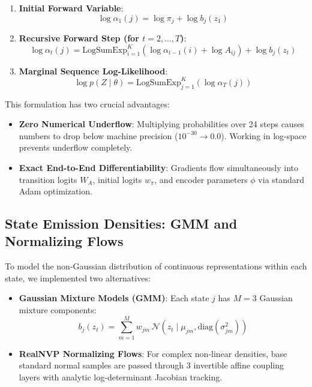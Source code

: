 \documentclass[11pt,a4paper]{article}
\begin{document}
\begin{enumerate}
    \item \textbf{Initial Forward Variable}:
    \begin{equation}
        \log \alpha_1(j) = \log \pi_j + \log b_j(z_1)
    \end{equation}
    \item \textbf{Recursive Forward Step (for $t = 2, \dots, T$)}:
    \begin{equation}
        \log \alpha_t(j) = \text{LogSumExp}_{i=1}^K \left( \log \alpha_{t-1}(i) + \log A_{ij} \right) + \log b_j(z_t)
    \end{equation}
    \item \textbf{Marginal Sequence Log-Likelihood}:
    \begin{equation}
        \log p(Z \mid \theta) = \text{LogSumExp}_{j=1}^K \left( \log \alpha_T(j) \right)
    \end{equation}
\end{enumerate}
This formulation has two crucial advantages:
\begin{itemize}
    \item \textbf{Zero Numerical Underflow}: Multiplying probabilities over 24 steps causes numbers to drop below machine precision ($10^{-30} \to 0.0$). Working in log-space prevents underflow completely.
    \item \textbf{Exact End-to-End Differentiability}: Gradients flow simultaneously into transition logits $W_A$, initial logits $w_\pi$, and encoder parameters $\phi$ via standard Adam optimization.
\end{itemize}

\subsection{State Emission Densities: GMM and Normalizing Flows}
To model the non-Gaussian distribution of continuous representations within each state, we implemented two alternatives:
\begin{itemize}
    \item \textbf{Gaussian Mixture Models (GMM)}: Each state $j$ has $M = 3$ Gaussian mixture components:
    \begin{equation}
        b_j(z_t) = \sum_{m=1}^M w_{jm} \, \mathcal{N}(z_t \mid \mu_{jm}, \text{diag}(\sigma_{jm}^2))
    \end{equation}
    \item \textbf{RealNVP Normalizing Flows}: For complex non-linear densities, base standard normal samples are passed through 3 invertible affine coupling layers with analytic log-determinant Jacobian tracking.
\end{itemize}
\end{document}
